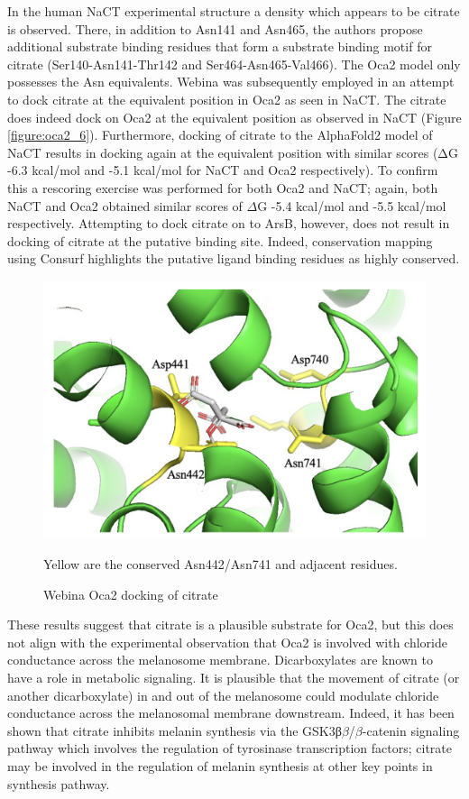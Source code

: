 In the human NaCT experimental structure \cite{sauer2021structure} a density which appears to be citrate is observed. There, in addition to Asn141 and Asn465, the authors propose additional substrate binding residues that form a substrate binding motif for citrate (Ser140-Asn141-Thr142 and Ser464-Asn465-Val466). The Oca2 model only possesses the Asn equivalents.  Webina \cite{kochnev2020webina} was subsequently employed in an attempt to dock citrate at the equivalent position in Oca2 as seen in NaCT. The citrate does indeed dock on Oca2 at the equivalent position as observed in NaCT (Figure \ref{figure:oca2_6}).  Furthermore, docking of citrate to the AlphaFold2 model of NaCT results in docking again at the equivalent position with similar scores (ΔG -6.3 kcal/mol and -5.1 kcal/mol for NaCT and Oca2 respectively).  To confirm this a rescoring exercise was performed for both Oca2 and NaCT; again, both NaCT and Oca2 obtained similar scores of $\Delta$G -5.4 kcal/mol and -5.5 kcal/mol respectively. Attempting to dock citrate on to ArsB, however, does not result in docking of citrate at the putative binding site.  Indeed, conservation mapping using Consurf highlights the putative ligand binding residues as highly conserved.



\begin{figure}[th!]
    \centering
    \includegraphics[width=150mm, scale=0.75]{oca2/oca2_7.png}
    \caption{Webina Oca2 docking of citrate}
    \label{fig:oca2_7}
    \small
    Yellow are the conserved Asn442/Asn741 and adjacent residues.
\end{figure}


These results suggest that citrate is a plausible substrate for Oca2, but this does not align with the experimental observation that Oca2 is involved with chloride conductance across the melanosome membrane.   Dicarboxylates are known to have a role in metabolic signaling. It is plausible that the movement of citrate (or another dicarboxylate) in and out of the melanosome could modulate chloride conductance across the melanosomal membrane downstream. Indeed, it has been shown that citrate inhibits melanin synthesis via the GSK3β$\beta$/$\beta$-catenin signaling pathway which involves the regulation of tyrosinase transcription factors\cite{zhou2020citric}; citrate may be involved in the regulation of melanin synthesis at other key points in synthesis pathway. 

